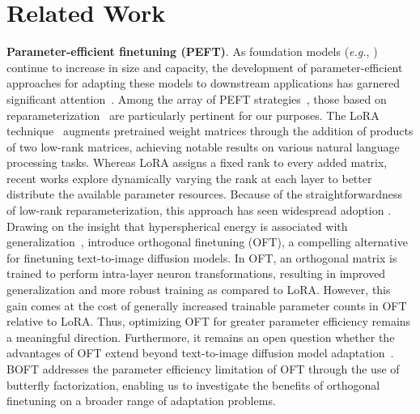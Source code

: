 \section{Related Work}

\textbf{Parameter-efficient finetuning (PEFT)}. As foundation models (\emph{e.g.}, \cite{brown2020language,radford2021learning,rombach2022high,kirillov2023segment}) continue to increase in size and capacity, the development of parameter-efficient approaches for adapting these models to downstream applications has garnered significant attention~\cite{treviso2023efficient,ding2023parameter,lialin2023scaling}. Among the array of PEFT strategies~\cite{houlsby2019parameter,aghajanyan2020intrinsic,hulora2022,edalati2022krona,wang2022adamix,gheini2021cross,zaken2022bitfit,guo2020parameter,sung2021training,ansell2022composable,lester2021power,li2021prefix,vu2022spot,he2021towards,mao2021unipelt,karimi2021compacter,liu2022few,sung2022lst,chen2022parameter,jia2022visual,chen2022adaptformer,zhang2022neural,jie2023fact,lian2022scaling,luo2023towards}, those based on reparameterization~\cite{aghajanyan2020intrinsic,hulora2022,edalati2022krona} are particularly pertinent for our purposes. The LoRA technique~\cite{hulora2022} augments pretrained weight matrices through the addition of products of two low-rank matrices, achieving notable results on various natural language processing tasks. Whereas LoRA assigns a fixed rank to every added matrix, recent works \cite{zhang2022adaptive,valipour2022dylora,zhang2023increlora} explore dynamically varying the rank at each layer to better distribute the available parameter resources. Because of the straightforwardness of low-rank reparameterization, this approach has seen widespread adoption \cite{dettmers2023qlora,zi2023delta,chavan2023one}. Drawing on the insight that hyperspherical energy is associated with generalization~\cite{liu2018learning,liu2021orthogonal}, \cite{qiu2023controlling} introduce orthogonal finetuning (OFT), a compelling alternative for finetuning text-to-image diffusion models. In OFT, an orthogonal matrix is trained to perform intra-layer neuron transformations, resulting in improved generalization and more robust training as compared to LoRA. However, this gain comes at the cost of generally increased trainable parameter counts in OFT relative to LoRA. Thus, optimizing OFT for greater parameter efficiency remains a meaningful direction. Furthermore, it remains an open question whether the advantages of OFT extend beyond text-to-image diffusion model adaptation~\cite{qiu2023controlling}. BOFT addresses the parameter efficiency limitation of OFT through the use of butterfly factorization, enabling us to investigate the benefits of orthogonal finetuning on a broader range of adaptation problems.

